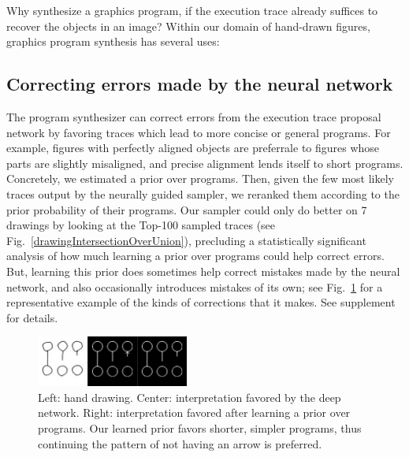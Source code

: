 \documentclass{article}
\newcommand{\remark}[1]{\textcolor{red}{[#1]}}
\begin{document}
Why synthesize a graphics program,
if the execution trace already suffices to recover the objects in an image?
Within our domain of hand-drawn figures, graphics program synthesis has several uses:

\subsection{Correcting errors made by the neural network}\label{synthesizerHelpsParsing}
The program synthesizer can correct errors from the execution
trace proposal network by favoring traces which lead to more
concise or general programs.  For example, figures with perfectly aligned objects are preferrale to figures whose parts are slightly misaligned, and precise alignment lends itself to short
programs.  Concretely, we estimated a prior over programs. Then,
given the few most likely traces output by the neurally guided sampler,
we reranked them according to the prior probability of their programs.
Our sampler could only do better on
7 drawings by looking at the Top-100 sampled traces
(see Fig.~\ref{drawingIntersectionOverUnion}),
precluding a statistically significant analysis of how much
learning a prior over programs could help correct errors.
But,
learning this prior does sometimes
help correct mistakes made by the neural network, and also
occasionally introduces mistakes of its own; see
Fig.~\ref{exampleOfProgramCorrectingMistake} for a representative
example of the kinds of corrections that it makes.
See supplement for details.
\begin{figure}
  \includegraphics[width = 5cm]{figures/programSuccess7.png}
  \caption{Left: hand drawing. Center: interpretation favored by the deep network. Right: interpretation favored after learning a prior over programs. Our learned prior favors shorter, simpler programs, thus continuing the pattern of not having an arrow is preferred.}\label{exampleOfProgramCorrectingMistake}
  \end{figure}
\end{document}
